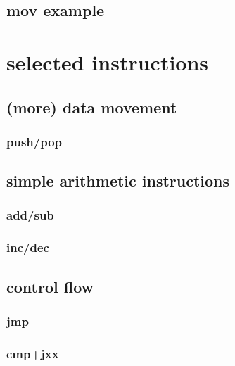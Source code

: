 

\subsection{mov example}




\section{selected instructions}

\subsection{(more) data movement}

\subsubsection{push/pop}



\subsection{simple arithmetic instructions}

\subsubsection{add/sub}



\subsubsection{inc/dec}



\subsection{control flow}

\subsubsection{jmp}



\subsubsection{cmp+jxx}

